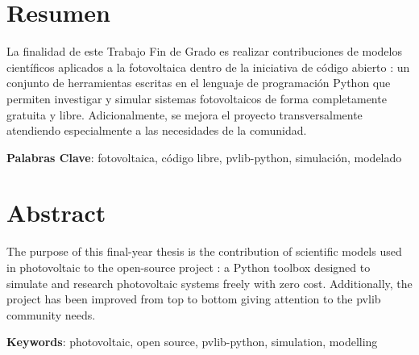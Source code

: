 \chapter*{Resumen} \label{chp:abstract}

La finalidad de este Trabajo Fin de Grado es realizar contribuciones de modelos científicos aplicados a la fotovoltaica dentro de la iniciativa de código abierto \pvlibpy: un conjunto de herramientas escritas en el lenguaje de programación Python que permiten investigar y simular sistemas fotovoltaicos de forma completamente gratuita y libre. Adicionalmente, se mejora el proyecto transversalmente atendiendo especialmente a las necesidades de la comunidad.

\textbf{Palabras Clave}: fotovoltaica, código libre, pvlib-python, simulación, modelado


\newpage


\chapter*{Abstract}

The purpose of this final-year thesis is the contribution of scientific models used in photovoltaic to the open-source project \pvlibpy: a Python toolbox designed to simulate and research photovoltaic systems freely with zero cost. Additionally, the project has been improved from top to bottom giving attention to the pvlib community needs.

\textbf{Keywords}: photovoltaic, open source, pvlib-python, simulation, modelling
